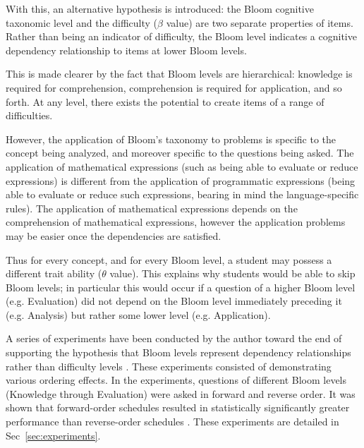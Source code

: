 With this, an alternative hypothesis is introduced: the Bloom cognitive
taxonomic level and the difficulty ($\beta$ value) are two separate properties
of items. Rather than being an indicator of difficulty, the Bloom level
indicates a cognitive dependency relationship to items at lower Bloom levels.

This is made clearer by the fact that Bloom levels are hierarchical: knowledge
is required for comprehension, comprehension is required for application, and
so forth.  At any level, there exists the potential to create items of a
range of difficulties. 

However, the application of Bloom's taxonomy to problems is specific to the
concept being analyzed, and moreover specific to the questions being asked.
The application of mathematical expressions (such as being able to evaluate or
reduce expressions) is different from the application of programmatic
expressions (being able to evaluate or reduce such expressions, bearing in mind
the language-specific rules).  The application of mathematical expressions
depends on the comprehension of mathematical expressions, however the
application problems may be easier once the dependencies are satisfied. 

Thus for every concept, and for every Bloom level, a student may possess a
different trait ability ($\theta$ value).  This explains why students would be
able to skip Bloom levels; in particular this would occur if a question of a
higher Bloom level (e.g. Evaluation) did not depend on the Bloom level
immediately preceding it (e.g. Analysis) but rather some lower level (e.g.
Application).  

A series of experiments have been conducted by the author toward the end of
supporting the hypothesis that Bloom levels represent dependency relationships
rather than difficulty levels \cite{castleberry2016effect}.  These experiments
consisted of demonstrating various ordering effects.  In the experiments,
questions of different Bloom levels (Knowledge through Evaluation) were asked
in forward and reverse order.  It was shown that forward-order schedules
resulted in statistically significantly greater performance than reverse-order
schedules \cite{castleberry2016effect}.   These experiments are detailed in
Sec~\ref{sec:experiments}.

